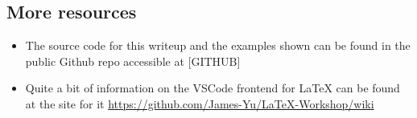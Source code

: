 \subsection{More resources}
\begin{itemize}
    \item 
    The source code for this writeup and the examples shown can be found in the public Github repo accessible at [GITHUB]
    
    \item 
    Quite a bit of information on the VSCode frontend for \LaTeX{} can be found at the site for it \url{https://github.com/James-Yu/LaTeX-Workshop/wiki}
\end{itemize}





%



    